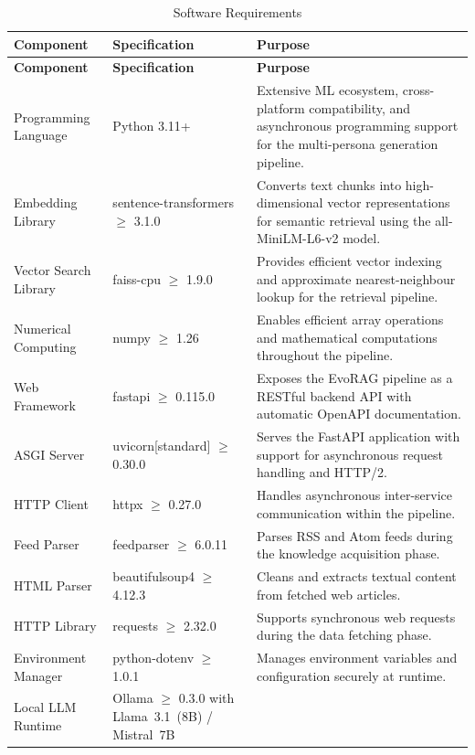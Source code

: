 \begin{center}
\small
\renewcommand{\arraystretch}{1.5}
\begin{longtable}{|p{3.8cm}|p{3.5cm}|p{6.2cm}|}
\caption{Software Requirements}
\label{tab:software} \\
\hline
\textbf{Component} & \textbf{Specification} & \textbf{Purpose} \\
\hline
\endfirsthead
\hline
\textbf{Component} & \textbf{Specification} & \textbf{Purpose} \\
\hline
\endhead
\hline
\endfoot
Programming Language & Python 3.11+ &
Extensive ML ecosystem, cross-platform compatibility, and asynchronous
programming support for the multi-persona generation pipeline. \\
\hline
Embedding Library & sentence-transformers $\geq$ 3.1.0 &
Converts text chunks into high-dimensional vector representations for
semantic retrieval using the all-MiniLM-L6-v2 model. \\
\hline
Vector Search Library & faiss-cpu $\geq$ 1.9.0 &
Provides efficient vector indexing and approximate nearest-neighbour
lookup for the retrieval pipeline. \\
\hline
Numerical Computing & numpy $\geq$ 1.26 &
Enables efficient array operations and mathematical computations
throughout the pipeline. \\
\hline
Web Framework & fastapi $\geq$ 0.115.0 &
Exposes the EvoRAG pipeline as a RESTful backend API with automatic
OpenAPI documentation. \\
\hline
ASGI Server & uvicorn[standard] $\geq$ 0.30.0 &
Serves the FastAPI application with support for asynchronous request
handling and HTTP/2. \\
\hline
HTTP Client & httpx $\geq$ 0.27.0 &
Handles asynchronous inter-service communication within the pipeline. \\
\hline
Feed Parser & feedparser $\geq$ 6.0.11 &
Parses RSS and Atom feeds during the knowledge acquisition phase. \\
\hline
HTML Parser & beautifulsoup4 $\geq$ 4.12.3 &
Cleans and extracts textual content from fetched web articles. \\
\hline
HTTP Library & requests $\geq$ 2.32.0 &
Supports synchronous web requests during the data fetching phase. \\
\hline
Environment Manager & python-dotenv $\geq$ 1.0.1 &
Manages environment variables and configuration securely at runtime. \\
\hline
Local LLM Runtime & Ollama $\geq$ 0.3.0 with Llama~3.1~(8B) / Mistral~7B &

\end{longtable}
\end{center}
